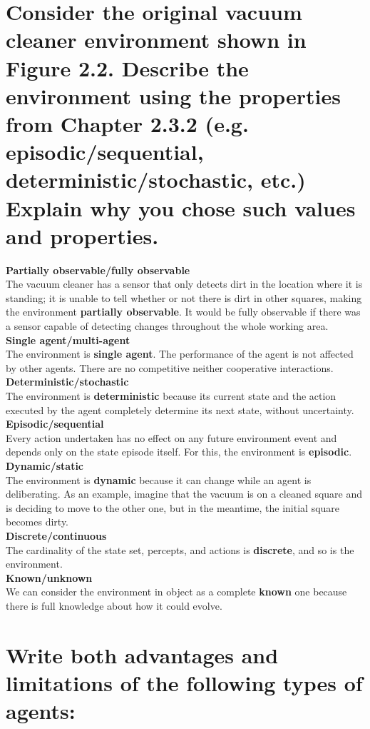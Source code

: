 \documentclass{article}
\begin{document}
\section{Consider the original vacuum cleaner environment shown in Figure 2.2.
Describe the environment using the properties from Chapter 2.3.2 (e.g. episodic/sequential, deterministic/stochastic, etc.)
Explain why you chose such values and properties.}
\textbf{Partially observable/fully observable}\\
The vacuum cleaner has a sensor that only detects dirt in the location where it is standing; it is unable to tell whether or not there is dirt in other squares, making the environment \textbf{partially observable}.
It would be fully observable if there was a sensor capable of detecting changes throughout the whole working area.\\
\textbf{Single agent/multi-agent}\\
The environment is \textbf{single agent}.
The performance of the agent is not affected by other agents.
There are no competitive neither cooperative interactions.\\
\textbf{Deterministic/stochastic}\\
The environment is \textbf{deterministic} because its current state and the action executed by the agent completely determine its next state, without uncertainty.\\
\textbf{Episodic/sequential}\\
Every action undertaken has no effect on any future environment event and depends only on the state episode itself.
For this, the environment is \textbf{episodic}.\\
\textbf{Dynamic/static}\\
The environment is \textbf{dynamic} because it can change while an agent is deliberating.
As an example, imagine that the vacuum is on a cleaned square and is deciding to move to the other one, but in the meantime, the initial square becomes dirty.\\
\textbf{Discrete/continuous}\\
The cardinality of the state set, percepts, and actions is \textbf{discrete}, and so is the environment.\\
\textbf{Known/unknown}\\
We can consider the environment in object as a complete \textbf{known} one because there is full knowledge about how it could evolve.


\section{Write both advantages and limitations of the following types of agents:}
\end{document}
